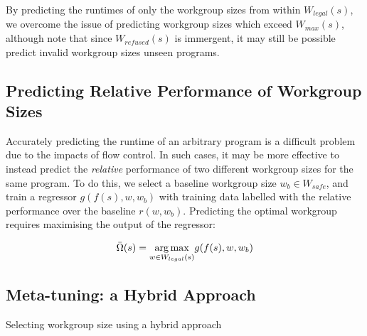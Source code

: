 By predicting the runtimes of only the workgroup sizes from within
$W_{legal}(s)$, we overcome the issue of predicting workgroup sizes
which exceed $W_{max}(s)$, although note that since $W_{refused}(s)$
is immergent, it may still be possible predict invalid workgroup sizes
unseen programs.

% 

\subsection{Predicting Relative Performance of Workgroup Sizes}

Accurately predicting the runtime of an arbitrary program is a
difficult problem due to the impacts of flow control. In such cases,
it may be more effective to instead predict the \emph{relative}
performance of two different workgroup sizes for the same program. To
do this, we select a baseline workgroup size $w_b \in W_{safe}$, and
train a regressor $g(f(s),w,w_b)$ with training data labelled with the
relative performance over the baseline $r(w, w_b)$. Predicting the
optimal workgroup requires maximising the output of the regressor:

\begin{equation}
  \bar{\Omega}(s) = \underset{w \in W_{legal}(s)}{\operatorname*{arg\,max}} g(f(s),w,w_b)
\end{equation}

% 


\subsection{Meta-tuning: a Hybrid Approach}


\begin{algorithm}

\caption{Selecting workgroup size using a hybrid approach}
\label{alg:autotune-hybrid}
\end{algorithm}



